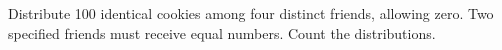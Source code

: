 Distribute 100 identical cookies among four distinct friends, allowing zero. Two specified friends must receive equal numbers. Count the distributions.
